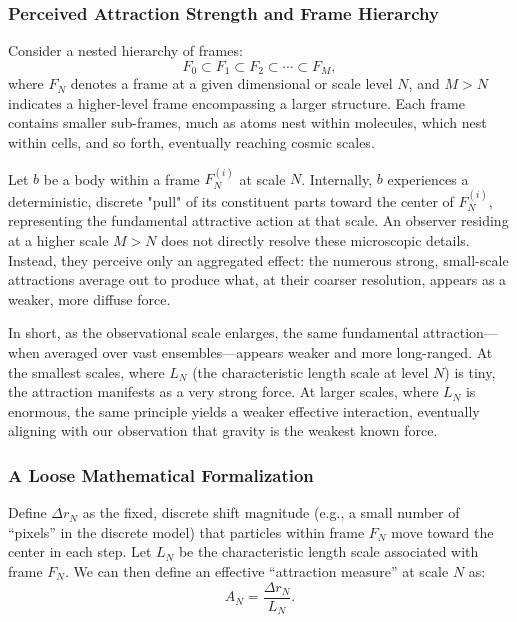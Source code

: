 \documentclass{report}
\begin{document}
\subsubsection*{Perceived Attraction Strength and Frame Hierarchy}

Consider a nested hierarchy of frames:
\[
F_0 \subset F_1 \subset F_2 \subset \cdots \subset F_M,
\]
where $F_N$ denotes a frame at a given dimensional or scale level $N$, and $M > N$ indicates a higher-level frame encompassing a larger structure. Each frame contains smaller sub-frames, much as atoms nest within molecules, which nest within cells, and so forth, eventually reaching cosmic scales.

Let $b$ be a body within a frame $F_N^{(i)}$ at scale $N$. Internally, $b$ experiences a deterministic, discrete "pull" of its constituent parts toward the center of $F_N^{(i)}$, representing the fundamental attractive action at that scale. An observer residing at a higher scale $M > N$ does not directly resolve these microscopic details. Instead, they perceive only an aggregated effect: the numerous strong, small-scale attractions average out to produce what, at their coarser resolution, appears as a weaker, more diffuse force.

In short, as the observational scale enlarges, the same fundamental attraction—when averaged over vast ensembles—appears weaker and more long-ranged. At the smallest scales, where $L_N$ (the characteristic length scale at level $N$) is tiny, the attraction manifests as a very strong force. At larger scales, where $L_N$ is enormous, the same principle yields a weaker effective interaction, eventually aligning with our observation that gravity is the weakest known force.

\subsubsection*{A Loose Mathematical Formalization}

Define $\Delta r_N$ as the fixed, discrete shift magnitude (e.g., a small number of “pixels” in the discrete model) that particles within frame $F_N$ move toward the center in each step. Let $L_N$ be the characteristic length scale associated with frame $F_N$. We can then define an effective “attraction measure” at scale $N$ as:
\[
A_N = \frac{\Delta r_N}{L_N}.
\]
\end{document}
